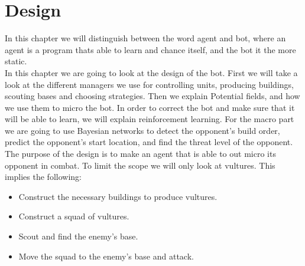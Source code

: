 \chapter{Design}\label{design}
	In this chapter we will distinguish between the word agent and bot, where an agent is a program thats able to learn and chance itself, and the bot it the more static. \\
	
	In this chapter we are going to look at the design of the bot. First we will take a look at the different managers we use for controlling units, producing buildings, scouting bases and choosing strategies. Then we explain Potential fields, and how we use them to micro the bot. In order to correct the bot and make sure that it will be able to learn, we will explain reinforcement learning. For the macro part we are going to use Bayesian networks to detect the opponent's build order, predict the opponent's start location, and find the threat level of the opponent.	\\
	
	The purpose of the design is to make an agent that is able to out micro its opponent in combat. To limit the scope we will only look at vultures. 
	This implies the following:
	\begin{itemize}
		\item Construct the necessary buildings to produce vultures.
		\item Construct a squad of vultures.
		\item Scout and find the enemy's base.
		\item Move the squad to the enemy's base and attack.
	\end{itemize}
	
	
	
	
	
	
	
	
